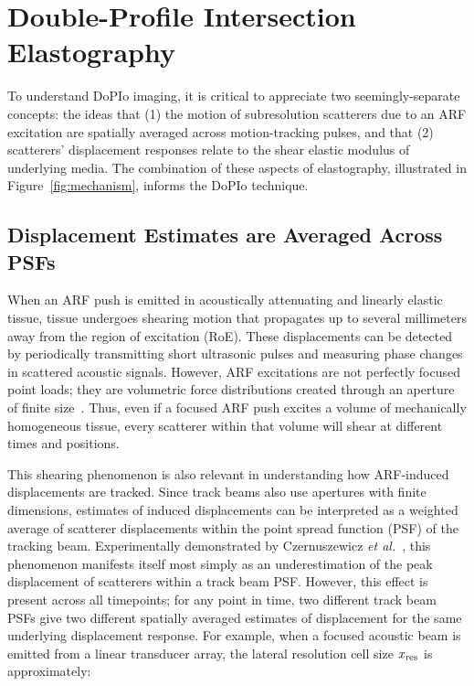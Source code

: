 \section{Double-Profile Intersection Elastography}
\label{sec:theory}

To understand DoPIo imaging, it is critical to appreciate two seemingly-separate concepts: the ideas that (1) the motion of subresolution scatterers due to an ARF excitation are spatially averaged across motion-tracking pulses, and that (2) scatterers' displacement responses relate to the shear elastic modulus of underlying media. The combination of these aspects of elastography, illustrated in Figure~\ref{fig:mechanism}, informs the DoPIo technique. 

\subsection{Displacement Estimates are Averaged Across PSFs}

When an ARF push is emitted in acoustically attenuating and linearly elastic tissue, tissue undergoes shearing motion that propagates up to several millimeters away from the region of excitation (RoE). These displacements can be detected by periodically transmitting short ultrasonic pulses and measuring phase changes in scattered acoustic signals. However, ARF excitations are not perfectly focused point loads; they are volumetric force distributions created through an aperture of finite size~\cite{walker_fundamental_1995,mcaleavey_Estimates_2003}. Thus, even if a focused ARF push excites a volume of mechanically homogeneous tissue, every scatterer within that volume will shear at different times and positions.

This shearing phenomenon is also relevant in understanding how ARF-induced displacements are tracked. Since track beams also use apertures with finite dimensions, estimates of induced displacements can be interpreted as a weighted average of scatterer displacements within the point spread function (PSF) of the tracking beam. Experimentally demonstrated by Czernuszewicz \emph{et al.}~\cite{czernuszewicz_Experimental_2013}, this phenomenon manifests itself most simply as an underestimation of the peak displacement of scatterers within a track beam PSF. However, this effect is present across all timepoints; for any point in time, two different track beam PSFs give two different spatially averaged estimates of displacement for the same underlying displacement response. For example, when a focused acoustic beam is emitted from a linear transducer array, the lateral resolution cell size $x_{\textnormal{res}}$ is approximately:


